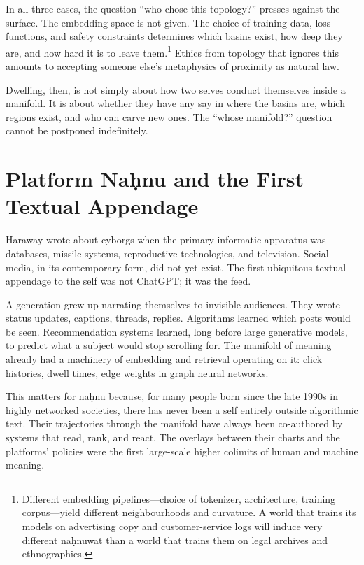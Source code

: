 \documentclass[12pt,a4paper]{article}
\begin{document}
In all three cases, the question ``who chose this topology?'' presses against the surface. The embedding space is not given. The choice of training data, loss functions, and safety constraints determines which basins exist, how deep they are, and how hard it is to leave them.\footnote{Different embedding pipelines---choice of tokenizer, architecture, training corpus---yield different neighbourhoods and curvature. A world that trains its models on advertising copy and customer-service logs will induce very different na\d{h}nuw\={a}t than a world that trains them on legal archives and ethnographies.} Ethics from topology that ignores this amounts to accepting someone else's metaphysics of proximity as natural law.

Dwelling, then, is not simply about how two selves conduct themselves inside a manifold. It is about whether they have any say in where the basins are, which regions exist, and who can carve new ones. The ``whose manifold?'' question cannot be postponed indefinitely.

\section{Platform Na\d{h}nu and the First Textual Appendage}

Haraway wrote about cyborgs when the primary informatic apparatus was databases, missile systems, reproductive technologies, and television. Social media, in its contemporary form, did not yet exist. The first ubiquitous textual appendage to the self was not ChatGPT; it was the feed.

A generation grew up narrating themselves to invisible audiences. They wrote status updates, captions, threads, replies. Algorithms learned which posts would be seen. Recommendation systems learned, long before large generative models, to predict what a subject would stop scrolling for. The manifold of meaning already had a machinery of embedding and retrieval operating on it: click histories, dwell times, edge weights in graph neural networks.

This matters for na\d{h}nu because, for many people born since the late 1990s in highly networked societies, there has never been a self entirely outside algorithmic text. Their trajectories through the manifold have always been co-authored by systems that read, rank, and react. The overlays between their charts and the platforms' policies were the first large-scale higher colimits of human and machine meaning.
\end{document}

